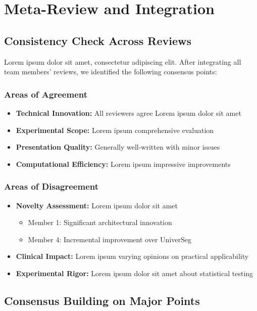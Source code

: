\section{Meta-Review and Integration}
\label{sec:meta_review}

\subsection{Consistency Check Across Reviews}
Lorem ipsum dolor sit amet, consectetur adipiscing elit. After integrating all team members' reviews, we identified the following consensus points:

\subsubsection{Areas of Agreement}
\begin{itemize}
    \item \textbf{Technical Innovation:} All reviewers agree Lorem ipsum dolor sit amet
    \item \textbf{Experimental Scope:} Lorem ipsum comprehensive evaluation
    \item \textbf{Presentation Quality:} Generally well-written with minor issues
    \item \textbf{Computational Efficiency:} Lorem ipsum impressive improvements
\end{itemize}

\subsubsection{Areas of Disagreement}
\begin{itemize}
    \item \textbf{Novelty Assessment:} Lorem ipsum dolor sit amet
    \begin{itemize}
        \item Member 1: Significant architectural innovation
        \item Member 4: Incremental improvement over UniverSeg
    \end{itemize}
    \item \textbf{Clinical Impact:} Lorem ipsum varying opinions on practical applicability
    \item \textbf{Experimental Rigor:} Lorem ipsum dolor sit amet about statistical testing
\end{itemize}

\subsection{Consensus Building on Major Points}
